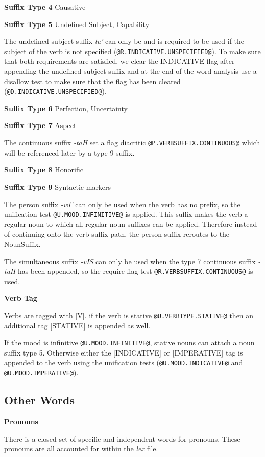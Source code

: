 \documentclass[11pt]{article}
\begin{document}
\textbf{Suffix Type 4} Causative

\textbf{Suffix Type 5} Undefined Subject, Capability

The undefined subject suffix \textit{lu'} can only be and is required to be used if the subject of the verb is not specified (\texttt{@R.INDICATIVE.UNSPECIFIED@}). To make sure that both requirements are satisfied, we clear the INDICATIVE flag after appending the undefined-subject suffix and at the end of the word analysis use a disallow test to make sure that the flag has been cleared (\texttt{@D.INDICATIVE.UNSPECIFIED@}).

\textbf{Suffix Type 6} Perfection, Uncertainty

\textbf{Suffix Type 7} Aspect

The continuous suffix \textit{-taH} set a flag diacritic \texttt{@P.VERBSUFFIX.CONTINUOUS@} which will be referenced later by a type 9 suffix.

\textbf{Suffix Type 8} Honorific

\textbf{Suffix Type 9} Syntactic markers

The person suffix \textit{-wI'} can only be used when the verb has no prefix, so the unification test \texttt{@U.MOOD.INFINITIVE@} is applied. This suffix makes the verb a regular noun to which all regular noun suffixes can be applied. Therefore instead of continuing onto the verb suffix path, the person suffix reroutes to the NounSuffix.

The simultaneous suffix \textit{-vIS} can only be used when the type 7 continuous suffix \textit{-taH} has been appended, so the require flag test \texttt{@R.VERBSUFFIX.CONTINUOUS@} is used.

\textbf{Verb Tag}

Verbs are tagged with [V]. if the verb is stative \texttt{@U.VERBTYPE.STATIVE@} then an additional tag [STATIVE] is appended as well.

If the mood is infinitive \texttt{@U.MOOD.INFINITIVE@}, stative nouns can attach a noun suffix type 5. Otherwise either the [INDICATIVE] or [IMPERATIVE] tag is appended to the verb using the unification tests (\texttt{@U.MOOD.INDICATIVE@} and \texttt{@U.MOOD.IMPERATIVE@}).

\subsection {Other Words}

\textbf{Pronouns}

There is a closed set of specific and independent words for pronouns. These pronouns are all accounted for within the \textit{lex} file.
\end{document}
